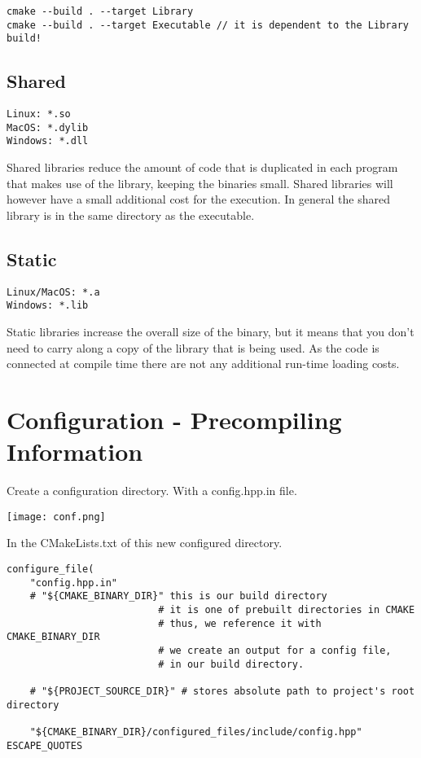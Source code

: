 \begin{verbatim}
cmake --build . --target Library
cmake --build . --target Executable // it is dependent to the Library build!
\end{verbatim}

\subsection{Shared}

\begin{verbatim}
Linux: *.so
MacOS: *.dylib
Windows: *.dll
\end{verbatim}

Shared libraries reduce the amount of code that is duplicated in each program that makes use of the library, keeping the binaries small.
Shared libraries will however have a small additional cost for the execution.
In general the shared library is in the same directory as the executable.

\subsection{Static}

\begin{verbatim}
Linux/MacOS: *.a
Windows: *.lib
\end{verbatim}

Static libraries increase the overall size of the binary, but it means that you don't need to carry along a copy of the library that is being used.
As the code is connected at compile time there are not any additional run-time loading costs.

\section{Configuration - Precompiling Information}

Create a configuration directory. With a config.hpp.in file.

\begin{center}
    \texttt{[image: conf.png]}
\end{center}

In the CMakeLists.txt of this new configured directory.

\begin{verbatim}
configure_file(
    "config.hpp.in"
    # "${CMAKE_BINARY_DIR}" this is our build directory
                          # it is one of prebuilt directories in CMAKE
                          # thus, we reference it with CMAKE_BINARY_DIR
                          # we create an output for a config file, 
                          # in our build directory.

    # "${PROJECT_SOURCE_DIR}" # stores absolute path to project's root directory

    "${CMAKE_BINARY_DIR}/configured_files/include/config.hpp" ESCAPE_QUOTES 
\end{verbatim}

